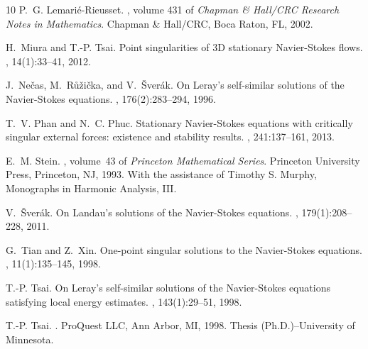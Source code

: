 \documentclass[12pt]{amsart}
\numberwithin{equation}{section}              %
\theoremstyle{remark}
\begin{document}
\begin{thebibliography}{10}
      	P.~G. Lemari\'{e}-Rieusset.
      	, volume
      	431 of {\em Chapman \& Hall/CRC Research Notes in Mathematics}.
      	\newblock Chapman \& Hall/CRC, Boca Raton, FL, 2002.
      	
      	H.~Miura and T.-P. Tsai.
      	\newblock Point singularities of 3{D} stationary {N}avier-{S}tokes flows.
      	, 14(1):33--41, 2012.
      	
      	J.~Ne\v{c}as, M.~R{\r u}\v{z}i\v{c}ka, and V.~{\v{S}}ver{\'{a}}k.
      	\newblock On {L}eray's self-similar solutions of the {N}avier-{S}tokes
      	equations.
      	, 176(2):283--294, 1996.
      	
      	T.~V. Phan and N.~C. Phuc.
      	\newblock Stationary {N}avier-{S}tokes equations with critically singular
      	external forces: existence and stability results.
      	, 241:137--161, 2013.
      	
      	E.~M. Stein.
      	, volume~43 of {\em Princeton Mathematical Series}.
      	\newblock Princeton University Press, Princeton, NJ, 1993.
      	\newblock With the assistance of Timothy S. Murphy, Monographs in Harmonic
      	Analysis, III.
      	
      	V.~{\v{S}}ver{\'{a}}k.
      	\newblock On {L}andau's solutions of the {N}avier-{S}tokes equations.
      	, 179(1):208--228, 2011.
      	
      	G.~Tian and Z.~Xin.
      	\newblock One-point singular solutions to the {N}avier-{S}tokes equations.
      	, 11(1):135--145, 1998.
      	
      	T.-P. Tsai.
      	\newblock On {L}eray's self-similar solutions of the {N}avier-{S}tokes
      	equations satisfying local energy estimates.
      	, 143(1):29--51, 1998.
      	
      	T.-P. Tsai.
      	.
      	\newblock ProQuest LLC, Ann Arbor, MI, 1998.
      	\newblock Thesis (Ph.D.)--University of Minnesota.
      	

\end{thebibliography}
\end{document}
